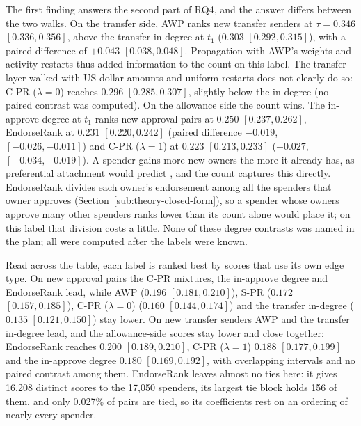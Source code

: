 The first finding answers the second part of RQ4, and the answer differs between the two walks. On the transfer side, AWP ranks new transfer senders at $\tau=0.346$ $[0.336,0.356]$, above the transfer in-degree at $t_1$ ($0.303$ $[0.292,0.315]$), with a paired difference of $+0.043$ $[0.038,0.048]$. Propagation with AWP's weights and activity restarts thus added information to the count on this label. The transfer layer walked with US-dollar amounts and uniform restarts does not clearly do so: C-PR ($\lambda=0$) reaches $0.296$ $[0.285,0.307]$, slightly below the in-degree (no paired contrast was computed). On the allowance side the count wins. The in-approve degree at $t_1$ ranks new approval pairs at $0.250$ $[0.237,0.262]$, EndorseRank at $0.231$ $[0.220,0.242]$ (paired difference $-0.019$, $[-0.026,-0.011]$) and C-PR ($\lambda=1$) at $0.223$ $[0.213,0.233]$ ($-0.027$, $[-0.034,-0.019]$). A spender gains more new owners the more it already has, as preferential attachment would predict \parencite{barabasi1999scaling}, and the count captures this directly. EndorseRank divides each owner's endorsement among all the spenders that owner approves (Section~\ref{sub:theory-closed-form}), so a spender whose owners approve many other spenders ranks lower than its count alone would place it; on this label that division costs a little. None of these degree contrasts was named in the plan; all were computed after the labels were known.

Read across the table, each label is ranked best by scores that use its own edge type. On new approval pairs the C-PR mixtures, the in-approve degree and EndorseRank lead, while AWP ($0.196$ $[0.181,0.210]$), S-PR ($0.172$ $[0.157,0.185]$), C-PR ($\lambda=0$) ($0.160$ $[0.144,0.174]$) and the transfer in-degree ($0.135$ $[0.121,0.150]$) stay lower. On new transfer senders AWP and the transfer in-degree lead, and the allowance-side scores stay lower and close together: EndorseRank reaches $0.200$ $[0.189,0.210]$, C-PR ($\lambda=1$) $0.188$ $[0.177,0.199]$ and the in-approve degree $0.180$ $[0.169,0.192]$, with overlapping intervals and no paired contrast among them. EndorseRank leaves almost no ties here: it gives 16,208 distinct scores to the 17,050 spenders, its largest tie block holds 156 of them, and only 0.027\% of pairs are tied, so its coefficients rest on an ordering of nearly every spender.

